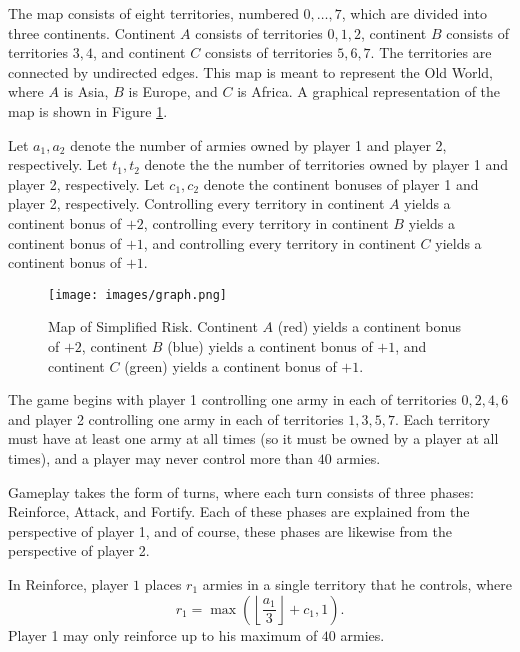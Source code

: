 \documentclass[final,5p,times,twocolumn]{elsarticle}
\begin{document}
The map consists of eight territories, numbered $0, \ldots, 7$, which are divided into three continents. Continent $A$ consists of territories $0, 1, 2$, continent $B$ consists of territories $3, 4$, and continent $C$ consists of territories $5, 6, 7$. The territories are connected by undirected edges. This map is meant to represent the Old World, where $A$ is Asia, $B$ is Europe, and $C$ is Africa. A graphical representation of the map is shown in Figure \ref{fig:map}.

Let $a_{1}, a_{2}$ denote the number of armies owned by player 1 and player 2, respectively. Let $t_{1}, t_{2}$ denote the the number of territories owned by player 1 and player 2, respectively. Let $c_{1}, c_{2}$ denote the continent bonuses of player 1 and player 2, respectively. Controlling every territory in continent $A$ yields a continent bonus of $+2$, controlling every territory in continent $B$ yields a continent bonus of $+1$, and controlling every territory in continent $C$ yields a continent bonus of $+1$.

\begin{figure}[h!]
    \centering
    \texttt{[image: images/graph.png]}
    \caption{Map of Simplified Risk. Continent $A$ (red) yields a continent bonus of $+2$, continent $B$ (blue) yields a continent bonus of $+1$, and continent $C$ (green) yields a continent bonus of $+1$.}
    \label{fig:map}
\end{figure}

The game begins with player 1 controlling one army in each of territories $0, 2, 4, 6$ and player 2 controlling one army in each of territories $1, 3, 5, 7$. Each territory must have at least one army at all times (so it must be owned by a player at all times), and a player may never control more than $40$ armies.

Gameplay takes the form of turns, where each turn consists of three phases: Reinforce, Attack, and Fortify. Each of these phases are explained from the perspective of player 1, and of course, these phases are likewise from the perspective of player 2.

In Reinforce, player $1$ places $r_{1}$ armies in a single territory that he controls, where 
$$r_{1} = \max\left(\left\lfloor \frac{a_{1}}{3} \right\rfloor + c_{1}, 1\right).$$
Player 1 may only reinforce up to his maximum of $40$ armies.
\end{document}
